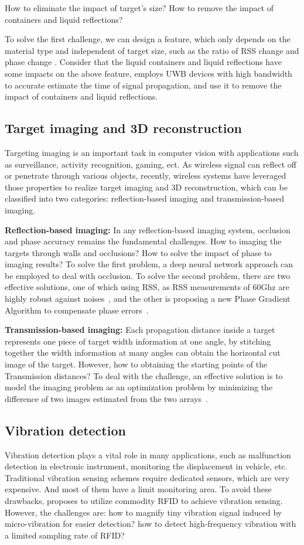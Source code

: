 How to eliminate the impact of target's size? How to remove the impact of containers and liquid reflections?

To solve the first challenge, we can design a feature, which only depends on the material type and independent of target size, such as the ratio of RSS change and phase change \cite{Tagscan}. Consider that the liquid containers and liquid reflections have some impacts on the above feature, \cite{LiquID} employs UWB devices with high bandwidth to accurate estimate the time of signal propagation, and use it to remove the impact of containers and liquid reflections.


\subsection{Target imaging and 3D reconstruction} Targeting imaging is an important task in computer vision with applications such as surveillance, activity recognition, gaming, ect. As wireless signal can reflect off or penetrate through various objects, recently, wireless systems have leveraged those properties to realize target imaging and 3D reconstruction, which can be classified into two categories: reflection-based imaging and transmission-based imaging.


\textbf{Reflection-based imaging:} In any reflection-based imaging system, occlusion and phase accuracy remains the fundamental challenges. How to imaging the targets through walls and occlusions? How to solve the impact of phase to imaging results?
To solve the first problem, a deep neural network approach can be employed to deal with occlusion. To solve the second problem, there are two effective solutions, one of which using RSS, as RSS measurements of 60Ghz are highly robust against noises~\cite{Zhu2015Reusing}, and the other is proposing a new Phase Gradient Algorithm to compensate phase errors~\cite{mao2018aim}.

\textbf{Transmission-based imaging:} Each propagation distance inside a target represents one piece of target width information at one angle, by stitching together the width information at many angles can obtain the horizontal cut image of the target. However, how to obtaining the starting points of the Transmission distances?
To deal with the challenge, an effective solution is to model the imaging problem as an optimization problem by minimizing the difference of two images estimated from the two arrays~\cite{Tagscan}.


\subsection{Vibration detection} Vibration detection plays a vital role in many applications, such as malfunction detection in electronic instrument, monitoring the displacement in vehicle, etc. Traditional vibration sensing schemes require dedicated sensors, which are very expensive. And most of them have a limit monitoring area. To avoid these drawbacks, \cite{Tagbeat} proposes to utilize commodity RFID to achieve
vibration sensing. However, the challenges are: how to magnify tiny vibration signal induced by micro-vibration for easier detection? how to detect high-frequency vibration with a limited sampling rate of RFID?

